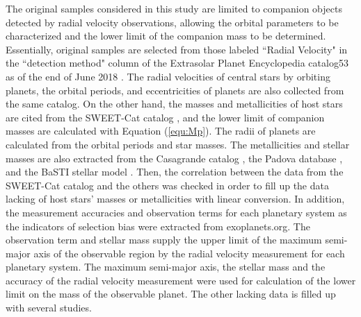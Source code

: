 \documentclass[twocolumn, dvipdfmx]{aastex62}
\begin{document}
\begin{CJK*}{UTF8}{min}
The original samples considered in this study are limited to companion objects detected by radial velocity observations, allowing the orbital parameters to be characterized and the lower limit of the companion mass to be determined. Essentially, original samples are selected from those labeled ``Radial Velocity" in the ``detection method" column of the Extrasolar Planet Encyclopedia catalog53 as of the end of June 2018 \citep{2011A&A...532A..79S}. The radial velocities of central stars by orbiting planets, the orbital periods, and eccentricities of planets are also collected from the same catalog. On the other hand, the masses and metallicities of host stars are cited from the SWEET-Cat catalog \citep{2013A&A...556A.150S, 2018A&A...620A..58S}, and the lower limit of companion masses are calculated with Equation (\ref{equ:Mp}). The radii of planets are calculated from the orbital periods and star masses. The metallicities and stellar masses are also extracted from the Casagrande catalog \citep{2011A&A...530A.138C}, the Padova database \citep{2000A&AS..141..371G}, and the BaSTI stellar model \citep{2018ApJ...856..125H}. Then, the correlation between the data from the SWEET-Cat catalog and the others was checked in order to fill up the data lacking of host stars' masses or metallicities with linear conversion. In addition, the measurement accuracies and observation terms for each planetary system as the indicators of selection bias were extracted from exoplanets.org. The observation term and stellar mass supply the upper limit of the maximum semi-major axis of the observable region by the radial velocity measurement for each planetary system. The maximum semi-major axis, the stellar mass and the accuracy of the radial velocity measurement were used for calculation of the lower limit on the mass of the observable planet. The other lacking data is filled up with several studies.


\end{CJK*}
\end{document}
